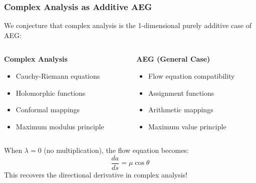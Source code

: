 \documentclass[aspectratio=169]{beamer}
\begin{document}
\begin{frame}
    \frametitle{Complex Analysis as Additive AEG}
    We conjecture that complex analysis is the 1-dimensional purely additive case of AEG:
    
    \begin{columns}
        \begin{column}{0.5\textwidth}
            \textbf{Complex Analysis}
            \begin{itemize}
                \item Cauchy-Riemann equations
                \item Holomorphic functions
                \item Conformal mappings
                \item Maximum modulus principle
            \end{itemize}
        \end{column}
        \begin{column}{0.5\textwidth}
            \textbf{AEG (General Case)}
            \begin{itemize}
                \item Flow equation compatibility
                \item Assignment functions
                \item Arithmetic mappings
                \item Maximum value principle
            \end{itemize}
        \end{column}
    \end{columns}
    
    \vspace{0.5cm}
    
    When $\lambda = 0$ (no multiplication), the flow equation becomes:
    \[
        \frac{da}{ds} = \mu \cos \theta
    \]
    This recovers the directional derivative in complex analysis!
\end{frame}
\end{document}
